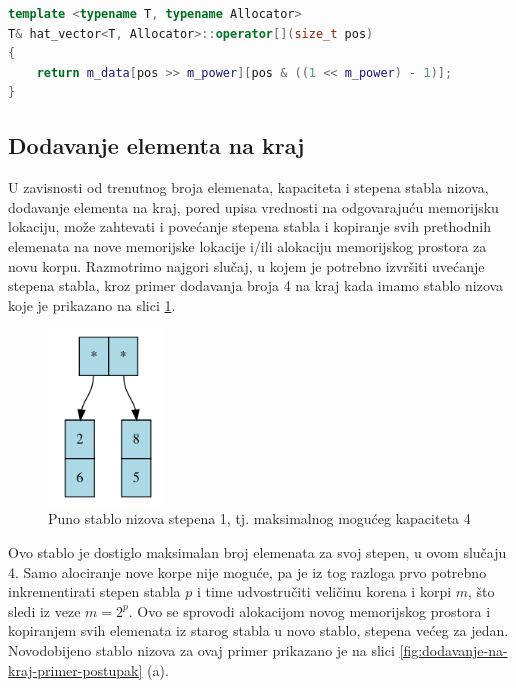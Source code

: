 \documentclass[a4paper]{article}
\begin{document}
\begin{lstlisting}[language=C++, caption={Operacija pristupa elementu po indeksu \textit{pos}}, captionpos=b, label={lst:pristup-elementu}]
template <typename T, typename Allocator>
T& hat_vector<T, Allocator>::operator[](size_t pos)
{
    return m_data[pos >> m_power][pos & ((1 << m_power) - 1)];
}
\end{lstlisting}

\subsection{Dodavanje elementa na kraj}
\label{subsec:dodavanje-elementa-na-kraj}

U zavisnosti od trenutnog broja elemenata, kapaciteta i stepena stabla nizova, dodavanje elementa na kraj, pored upisa vrednosti na odgovarajuću memorijsku lokaciju, može zahtevati i povećanje stepena stabla i kopiranje svih prethodnih elemenata na nove memorijske lokacije i/ili alokaciju memorijskog prostora za novu korpu. Razmotrimo najgori slučaj, u kojem je potrebno izvršiti uvećanje stepena stabla, kroz primer dodavanja broja 4 na kraj kada imamo stablo nizova koje je prikazano na slici \ref{fig:dodavanje-na-kraj-primer-pocetak}.

\begin{figure}[h!]
    \centering
    \includegraphics[width=0.28\textwidth]{ilustracije/dodavanje-na-kraj-primer-1.png}
    \caption{Puno stablo nizova stepena 1, tj. maksimalnog mogućeg kapaciteta 4}
    \label{fig:dodavanje-na-kraj-primer-pocetak}
\end{figure}

Ovo stablo je dostiglo maksimalan broj elemenata za svoj stepen, u ovom slučaju 4. Samo alociranje nove korpe nije moguće, pa je iz tog razloga prvo potrebno inkrementirati stepen stabla $p$ i time udvostručiti veličinu korena i korpi $m$, što sledi iz veze $m = 2^p$. Ovo se sprovodi alokacijom novog memorijskog prostora i kopiranjem svih elemenata iz starog stabla u novo stablo, stepena većeg za jedan. Novodobijeno stablo nizova za ovaj primer prikazano je na slici \ref{fig:dodavanje-na-kraj-primer-postupak} (a).
\end{document}
